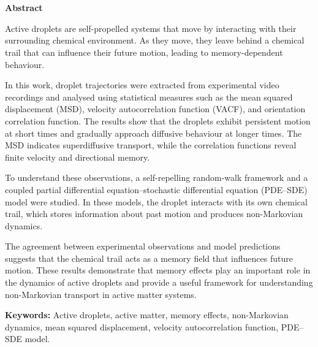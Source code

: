 
\chapter*{}

\begin{center}
{\Huge\bfseries Abstract}
\end{center}

\vspace{1cm}

Active droplets are self-propelled systems that move by interacting
with their surrounding chemical environment. As they move, they leave
behind a chemical trail that can influence their future motion,
leading to memory-dependent behaviour.

\medskip

In this work, droplet trajectories were extracted from experimental
video recordings and analysed using statistical measures such as the
mean squared displacement (MSD), velocity autocorrelation function
(VACF), and orientation correlation function. The results show that
the droplets exhibit persistent motion at short times and gradually
approach diffusive behaviour at longer times. The MSD indicates
superdiffusive transport, while the correlation functions reveal
finite velocity and directional memory.

\medskip

To understand these observations, a self-repelling random-walk
framework and a coupled partial differential equation--stochastic
differential equation (PDE--SDE) model were studied. In these models,
the droplet interacts with its own chemical trail, which stores
information about past motion and produces non-Markovian dynamics.

\medskip

The agreement between experimental observations and model predictions
suggests that the chemical trail acts as a memory field that
influences future motion. These results demonstrate that memory
effects play an important role in the dynamics of active droplets and
provide a useful framework for understanding non-Markovian transport
in active matter systems.

\vspace{1cm}

\noindent
\textbf{Keywords:} Active droplets, active matter, memory effects,
non-Markovian dynamics, mean squared displacement, velocity
autocorrelation function, PDE--SDE model.

\newpage
